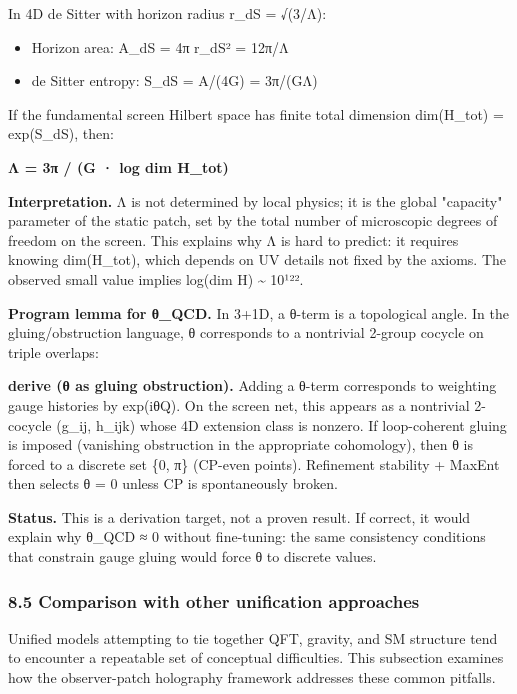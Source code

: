 In 4D de Sitter with horizon radius r\_dS = √(3/Λ):

\begin{itemize}
\tightlist
\item
  Horizon area: A\_dS = 4π r\_dS² = 12π/Λ
\item
  de Sitter entropy: S\_dS = A/(4G) = 3π/(GΛ)
\end{itemize}

If the fundamental screen Hilbert space has finite total dimension dim(H\_tot) = exp(S\_dS), then:

\textbf{Λ = 3π / (G · log dim H\_tot)}

\textbf{Interpretation.} Λ is not determined by local physics; it is the global "capacity" parameter of the static patch, set by the total number of microscopic degrees of freedom on the screen. This explains why Λ is hard to predict: it requires knowing dim(H\_tot), which depends on UV details not fixed by the axioms. The observed small value implies log(dim H) \textasciitilde{} 10¹²².

\textbf{Program lemma for θ\_QCD.} In 3+1D, a θ-term is a topological angle. In the gluing/obstruction language, θ corresponds to a nontrivial 2-group cocycle on triple overlaps:

\textbf{derive (θ as gluing obstruction).} Adding a θ-term corresponds to weighting gauge histories by exp(iθQ). On the screen net, this appears as a nontrivial 2-cocycle (g\_ij, h\_ijk) whose 4D extension class is nonzero. If loop-coherent gluing is imposed (vanishing obstruction in the appropriate cohomology), then θ is forced to a discrete set \{0, π\} (CP-even points). Refinement stability + MaxEnt then selects θ = 0 unless CP is spontaneously broken.

\textbf{Status.} This is a derivation target, not a proven result. If correct, it would explain why θ\_QCD ≈ 0 without fine-tuning: the same consistency conditions that constrain gauge gluing would force θ to discrete values.

\subsubsection{8.5 Comparison with other unification approaches}\label{85-comparison-with-other-unification-approaches}

Unified models attempting to tie together QFT, gravity, and SM structure tend to encounter a repeatable set of conceptual difficulties. This subsection examines how the observer-patch holography framework addresses these common pitfalls.


